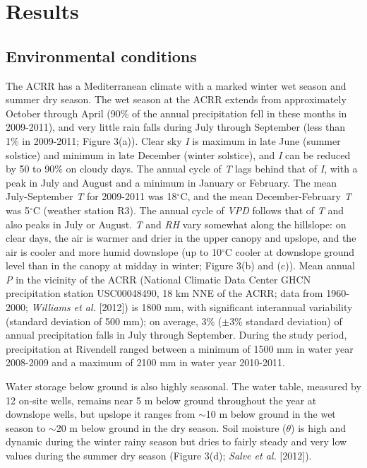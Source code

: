 \section{Results}

\subsection{Environmental conditions}
The ACRR has a Mediterranean climate with a marked winter wet season and summer dry season.  The wet season at the ACRR extends from approximately October through April (90\% of the annual precipitation fell in these months in 2009-2011), and very little rain falls during July through September (less than 1\% in 2009-2011; Figure 3(a)).  Clear sky \textit{I} is maximum in late June (summer solstice) and minimum in late December (winter solstice), and \textit{I} can be reduced by 50 to 90\% on cloudy days.  The annual cycle of \textit{T} lags behind that of \textit{I}, with a peak in July and August and a minimum in January or February. The mean July-September \textit{T} for 2009-2011 was 18$^{\circ}$C, and the mean December-February \textit{T} was 5$^{\circ}$C (weather station R3).  The annual cycle of \textit{VPD} follows that of \textit{T} and also peaks in July or August.  \textit{T} and \textit{RH} vary somewhat along the hillslope: on clear days, the air is warmer and drier in the upper canopy and upslope, and the air is cooler and more humid downslope (up to 10$^{\circ}$C cooler at downslope ground level than in the canopy at midday in winter; Figure 3(b) and (c)).  Mean annual \textit{P} in the vicinity of the ACRR (National Climatic Data Center GHCN precipitation station USC00048490, 18 km NNE of the ACRR; data from 1960-2000; \textit{Williams et al.} [2012]) is 1800 mm, with significant interannual variability (standard deviation of 500 mm); on average, 3\% ($\pm$3\% standard deviation) of annual precipitation falls in July through September.  During the study period, precipitation at Rivendell ranged between a minimum of 1500 mm in water year 2008-2009 and a maximum of 2100 mm in water year 2010-2011.

Water storage below ground is also highly seasonal. The water table, measured by 12 on-site wells, remains near 5 m below ground throughout the year at downslope wells, but upslope it ranges from $\sim$10 m below ground in the wet season to $\sim$20 m below ground in the dry season.   Soil moisture ($\theta$) is high and dynamic during the winter rainy season but dries to fairly steady and very low values during the summer dry season (Figure 3(d); \textit{Salve et al.} [2012]).  

